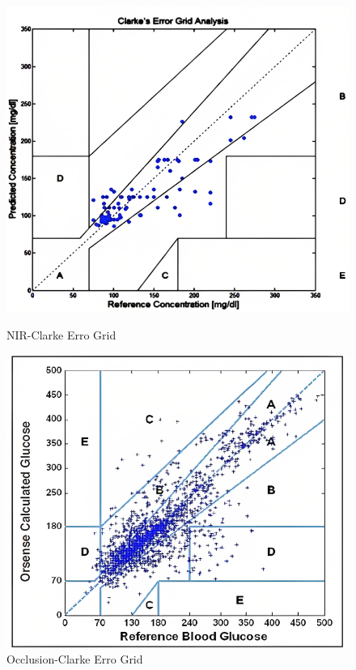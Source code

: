 \documentclass[fontsize=11pt,aspectratio=169,t,fleqn]{beamer}
\begin{document}
\begin{frame}
    \begin{figure}[!htb]
          \includegraphics[width=\linewidth]{fig/NIR_ceg.png}
          \caption{NIR-Clarke Erro Grid}
        \endminipage\hfill
          \includegraphics[width=\linewidth]{fig/occlusion_ceg.png}
          \caption{Occlusion-Clarke Erro Grid}
        \endminipage\hfill

\end{figure}
\end{frame}
\end{document}
